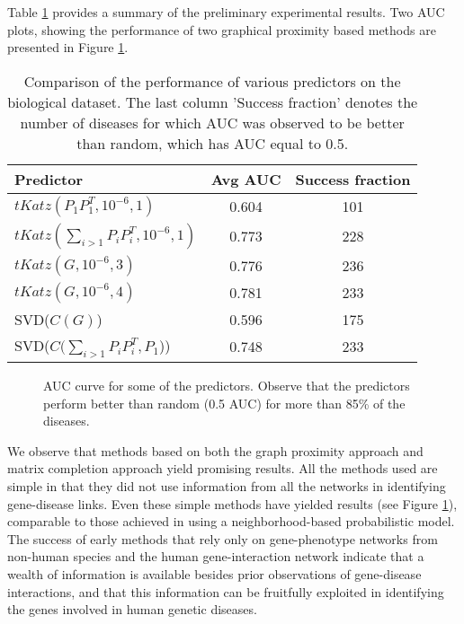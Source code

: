 Table \ref{tab:results} provides a summary of the preliminary experimental results. Two AUC plots, showing the performance of two graphical proximity based methods are presented in Figure \ref{fig:katzAUC}.
\begin{table} [ht]
\centering
\begin{tabular}{| p{7 cm} | c | c |} \hline
Predictor & Avg AUC & Success fraction\\ \hline
$tKatz(P_1P_1^T, 10^{-6}, 1)$ & 0.604 & 101 \\ \hline
$tKatz(\sum_{i>1} P_iP_i^T, 10^{-6}, 1)$& 0.773 & 228 \\ \hline
$tKatz(G, 10^{-6}, 3)$& 0.776 & 236 \\ \hline
$tKatz(G, 10^{-6}, 4)$& 0.781 & 233 \\ \hline
SVD($C(G)$) & 0.596 & 175 \\ \hline
SVD($C(\sum_{i>1} P_iP_i^T,P_1$)) & 0.748 & 233 \\ \hline
\end{tabular}
\caption{Comparison of the performance of various predictors on the biological dataset. The last column 'Success fraction' denotes the number of diseases for which AUC was observed to be better than random, which has AUC equal to 0.5.}
\label{tab:results}
\end{table}

\begin{figure}[ht]
\begin{center}
\end{center}
\vspace{-5ex}
\caption{AUC curve for some of the predictors. Observe that the predictors perform better than random (0.5 AUC) for more than 85\% of the diseases.}
\label{fig:katzAUC}
\end{figure}

We observe that methods based on both the graph proximity approach and matrix completion approach yield promising results. All the methods used are simple in that they did not use information from all the networks in identifying gene-disease links. Even these simple methods have yielded results (see Figure \ref{fig:katzAUC}), comparable to those achieved in \cite{McGaryOrthologousPhenotypes} using a neighborhood-based probabilistic model. The success of early methods that rely only on gene-phenotype networks from non-human species and the human gene-interaction network indicate that a wealth of information is available besides prior observations of gene-disease interactions, and that this information can be fruitfully exploited in identifying the genes involved in human genetic diseases.